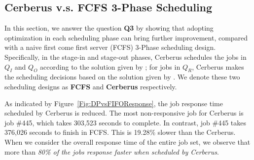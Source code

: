 \subsection{Cerberus v.s. FCFS 3-Phase Scheduling}

In this section, we answer the question \textbf{Q3} by showing that
adopting optimization in each scheduling phase can bring further improvement,
compared with a naive first come first server (FCFS) 3-Phase scheduling design.
Specifically, in the stage-in and stage-out phases, Cerberus schedules the jobs in $Q_I$ and $Q_O$
according to the solution given by ;
for jobs in $Q_R$, Cerberus makes the scheduling decisions
based on the solution given by . %
We denote these two scheduling designs
as \textbf{FCFS} and \textbf{Cerberus} respectively.

As indicated by Figure~\ref{Fig:DPvsFIFOResponse}, the job response time scheduled by Cerberus is reduced.
The most non-responsive job for Cerberus is job \#445, which takes 303,523 seconds to complete.
In contrast, job \#445 takes 376,026 seconds to finish in FCFS.
This is 19.28\% slower than the Cerberus.
When we consider the overall response time of the entire job set,
we observe that more than \textit{80\% of the jobs response faster when scheduled by Cerberus}.


